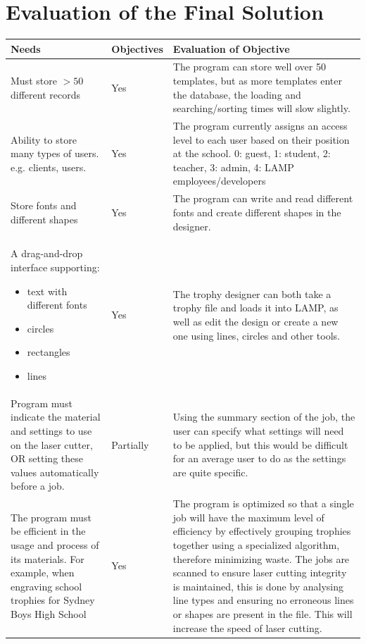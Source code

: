 \documentclass[oneside,openany,11pt,a4paper]{report}
\begin{document}
\section{Evaluation of the Final Solution}
\begin{longtable}{|p{4cm}|p{2cm}|p{8cm}|}
	
	\hline
	\rowcolor{gray!50}
	\textbf{Needs} & \textbf{Objectives} & \textbf{Evaluation of Objective} \\ \hline
	
	Must store $>50$ different records & 
	Yes &
	The program can store well over 50 templates, but as more templates enter the database, the loading and searching/sorting times will slow slightly. 
	\\ \hline
	
	Ability to store many types of users. e.g. clients, users. &
	Yes &
	The program currently assigns an access level to each user based on their position at the school. 0: guest, 1: student, 2: teacher, 3: admin, 4: LAMP employees/developers 
	\\ \hline
	
	Store fonts and different shapes &
	Yes &
	The program can write and read different fonts and create different shapes in the designer.
	\\ \hline
	
	A drag-and-drop interface supporting:
	\begin{itemize}
		\itemsep0em
		\item text with different fonts
		\item circles
		\item rectangles
		\item lines
	\end{itemize} &
	Yes &
	The trophy designer can both take a trophy file and loads it into LAMP, as well as edit the design or create a new one using lines, circles and other tools. 
	\\ \hline
	
	Program must indicate the material and settings to use on the laser cutter, OR setting these values automatically before a job. &
	Partially &
	Using the summary section of the job, the user can specify what settings will need to be applied, but this would be difficult for an average user to do as the settings are quite specific. 
	\\ \hline
	
	The program must be efficient in the usage and process of its materials. For example, when engraving school trophies for Sydney Boys High School & 
	Yes &
	The program is optimized so that a single job will have the maximum level of efficiency by effectively grouping trophies together using a specialized algorithm, therefore minimizing waste. \newline The jobs are scanned to ensure laser cutting integrity is maintained, this is done by analysing line types and ensuring no erroneous lines or shapes are present in the file. This will increase the speed of laser cutting. \\ \hline
	

\end{longtable}
\end{document}
